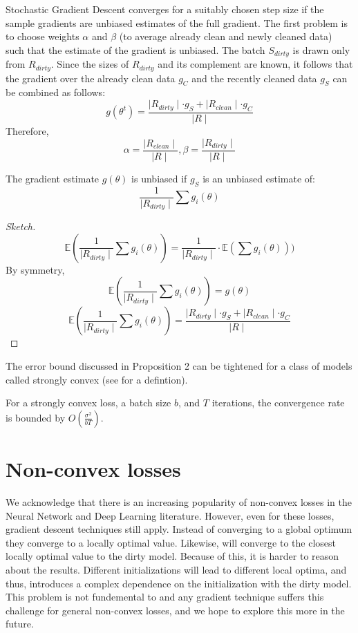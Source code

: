 Stochastic Gradient Descent converges for a suitably chosen step size if the sample gradients are unbiased estimates of the full gradient. 
The first problem is to choose weights $\alpha$ and $\beta$ (to average already clean and newly cleaned data) such that the estimate of the gradient is unbiased. 
The batch $S_{dirty}$ is drawn only from $R_{dirty}$.
Since the sizes of $R_{dirty}$ and its complement are known, it follows that the gradient over the already clean data $g_C$ and the recently cleaned data $g_S$ can be combined as follows:
\[
g(\theta^{t}) = \frac{\mid R_{dirty} \mid \cdot g_S + \mid R_{clean} \mid \cdot g_C  }{\mid R \mid}
\]
Therefore,
\[
\alpha = \frac{\mid R_{clean} \mid}{\mid R \mid}, \beta = \frac{\mid R_{dirty} \mid}{\mid R \mid}
\]

\begin{lemma}
The gradient estimate $g(\theta)$ is unbiased if $g_S$ is an unbiased estimate of:
\[
\frac{1}{\mid R_{dirty} \mid} \sum g_i(\theta)
\]
\end{lemma}
\begin{proof}[Sketch]
\[
\mathbb{E}(\frac{1}{\mid R_{dirty} \mid} \sum g_i(\theta)) = \frac{1}{\mid R_{dirty} \mid} \cdot \mathbb{E}(\sum g_i(\theta)))
\]
By symmetry, 
\[
\mathbb{E}(\frac{1}{\mid R_{dirty} \mid} \sum g_i(\theta)) = g(\theta)
\]
\[
\mathbb{E}(\frac{1}{\mid R_{dirty} \mid} \sum g_i(\theta)) = \frac{\mid R_{dirty} \mid \cdot g_S + \mid R_{clean} \mid \cdot g_C  }{\mid R \mid}
\]
\end{proof}

The error bound discussed in Proposition 2 can be tightened for a class of models called strongly convex (see \cite{bertsekas2011incremental} for a defintion). 

\begin{proposition}
For a strongly convex loss, a batch size $b$, and $T$ iterations, the convergence rate is bounded by $O(\frac{\sigma^2}{bT})$. 
\end{proposition}

\section{Non-convex losses}\label{non-convex}
We acknowledge that there is an increasing popularity of non-convex losses in the Neural Network and Deep Learning literature. 
However, even for these losses, gradient descent techniques still apply. 
Instead of converging to a global optimum they converge to a locally optimal value. 
Likewise, \sys will converge to the closest locally optimal value to the dirty model. 
Because of this, it is harder to reason about the results.
Different initializations will lead to different local optima, and thus, introduces a complex dependence on the initialization with the dirty model.
This problem is not fundemental to \sys and any gradient technique suffers this challenge for general non-convex losses, and we hope to explore this more in the future.

